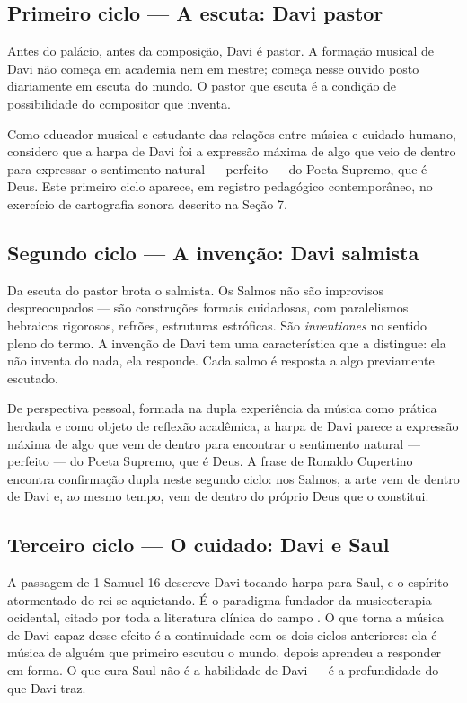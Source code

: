 \documentclass[12pt,a4paper]{article}
\begin{document}
\subsection{Primeiro ciclo --- A escuta: Davi pastor}

Antes do palácio, antes da composição, Davi é pastor. A formação musical de Davi não começa em academia nem em mestre; começa nesse ouvido posto diariamente em escuta do mundo. O pastor que escuta é a condição de possibilidade do compositor que inventa.

Como educador musical e estudante das relações entre música e cuidado humano, considero que a harpa de Davi foi a expressão máxima de algo que veio de dentro para expressar o sentimento natural --- perfeito --- do Poeta Supremo, que é Deus. Este primeiro ciclo aparece, em registro pedagógico contemporâneo, no exercício de cartografia sonora descrito na Seção 7.

\subsection{Segundo ciclo --- A invenção: Davi salmista}

Da escuta do pastor brota o salmista. Os Salmos \citep{Biblia1993} não são improvisos despreocupados --- são construções formais cuidadosas, com paralelismos hebraicos rigorosos, refrões, estruturas estróficas. São \textit{inventiones} no sentido pleno do termo. A invenção de Davi tem uma característica que a distingue: ela não inventa do nada, ela responde. Cada salmo é resposta a algo previamente escutado.

De perspectiva pessoal, formada na dupla experiência da música como prática herdada e como objeto de reflexão acadêmica, a harpa de Davi parece a expressão máxima de algo que vem de dentro para encontrar o sentimento natural --- perfeito --- do Poeta Supremo, que é Deus. A frase de Ronaldo Cupertino encontra confirmação dupla neste segundo ciclo: nos Salmos, a arte vem de dentro de Davi e, ao mesmo tempo, vem de dentro do próprio Deus que o constitui.

\subsection{Terceiro ciclo --- O cuidado: Davi e Saul}

A passagem de 1 Samuel 16 \citep{Biblia1993} descreve Davi tocando harpa para Saul, e o espírito atormentado do rei se aquietando. É o paradigma fundador da musicoterapia ocidental, citado por toda a literatura clínica do campo \citep{Bruscia2000}. O que torna a música de Davi capaz desse efeito é a continuidade com os dois ciclos anteriores: ela é música de alguém que primeiro escutou o mundo, depois aprendeu a responder em forma. O que cura Saul não é a habilidade de Davi --- é a profundidade do que Davi traz.
\end{document}
